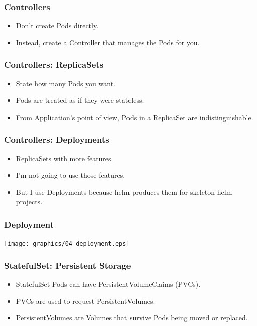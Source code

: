     \begin{frame}
        \frametitle{Controllers}
        \begin{itemize}
            \item Don't create Pods directly.
            \item Instead, create a Controller that manages the Pods for you.
        \end{itemize}
    \end{frame}

    \begin{frame}
        \frametitle{Controllers: ReplicaSets}
        \begin{itemize}
            \item State how many Pods you want.\pause
            \item Pods are treated as if they were stateless.\pause
            \item From Application's point of view, Pods in a ReplicaSet are indistinguishable.
        \end{itemize}
    \end{frame}

    \begin{frame}
        \frametitle{Controllers: Deployments}
        \begin{itemize}
            \item ReplicaSets with more features.\pause
            \item I'm not going to use those features.\pause
            \item But I use Deployments because helm produces them for skeleton helm projects.
        \end{itemize}
    \end{frame}

    \begin{frame}
        \frametitle{Deployment}
        \texttt{[image: graphics/04-deployment.eps]}
    \end{frame}

    \begin{frame}
        \frametitle{StatefulSet: Persistent Storage}
        \begin{itemize}
            \item StatefulSet Pods can have PersistentVolumeClaims (PVCs).\pause
            \item PVCs are used to request PersistentVolumes.\pause
            \item PersistentVolumes are Volumes that survive Pods being moved or replaced.
        \end{itemize}
    \end{frame}

